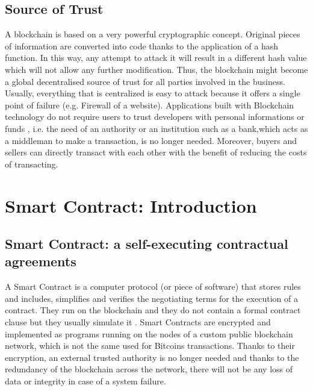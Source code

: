 \subsection{Source of Trust}
A blockchain is based on a very powerful cryptographic concept. Original pieces of information are converted into code thanks to the application of a hash function. In this way, any attempt to attack it will result in a different hash value which will not allow any further modification.
Thus, the blockchain might become a global decentralised source of trust \cite{blockchain3} for all parties involved in the business.\\
Usually, everything that is centralized is easy to attack because it offers a single point of failure (e.g. Firewall of a website). 
Applications built with Blockchain technology do not require users to trust developers with personal informations or funds \cite{blockchain3}, i.e. the need of an authority or an institution such as a bank,which acts as a middleman to make a transaction, is no longer needed. Moreover, buyers and sellers can directly transact with each other with the benefit of reducing the costs of transacting.
\section{Smart Contract: Introduction}
\subsection{Smart Contract: a self-executing contractual agreements}
A Smart Contract is a computer protocol (or piece of software) that stores rules and includes, simplifies and verifies the negotiating terms for the execution of a contract. They run on the blockchain \cite{paper3} and they do not contain a formal contract clause but they usually simulate it \cite{SC1}. Smart Contracts are encrypted and implemented as programs running on the nodes of a custom public blockchain network, which is not the same used for Bitcoins transactions. Thanks to their encryption, an external trusted authority is no longer needed and thanks to the redundancy of the blockchain across the network, there will not be any loss of data or integrity in case of a system failure.

